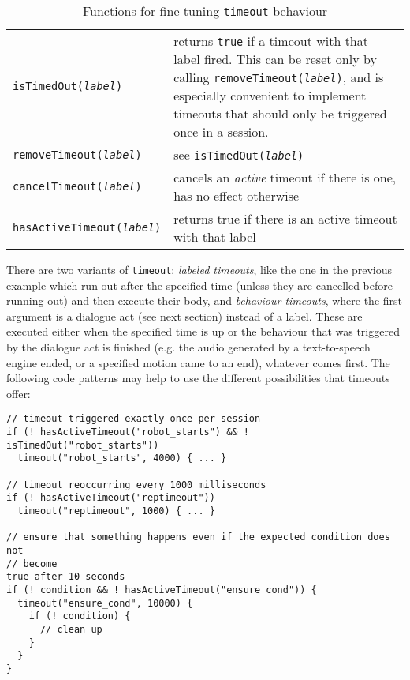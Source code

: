 \begin{table}[htb]
\begin{tabular}{lp{}}
\texttt{isTimedOut(\emph{label})}& returns \texttt{true} if a timeout with that
  label fired. This can be reset only by calling
  \texttt{removeTimeout(\emph{label})}, and is especially convenient to
  implement timeouts that should only be triggered once in a session. \\
\texttt{removeTimeout(\emph{label})}& see \texttt{isTimedOut(\emph{label})}\\
\texttt{cancelTimeout(\emph{label})}& cancels an \emph{active} timeout if there
                                      is one, has no effect otherwise \\
\texttt{hasActiveTimeout(\emph{label})}& returns true if there is an
  active timeout with that label \\
\end{tabular}
\caption{\label{tbl:timeoutfns}Functions for fine tuning \texttt{timeout} behaviour}
\end{table}

There are two variants of \texttt{timeout}: \emph{labeled timeouts}, like the
one in the previous example which run out after the specified time (unless they
are cancelled before running out) and then execute their body, and
\emph{behaviour timeouts}, where the first argument is a dialogue act (see next
section) instead of a label. These are executed either when the specified time
is up or the behaviour that was triggered by the dialogue act is finished
(e.g. the audio generated by a text-to-speech engine ended, or a specified
motion came to an end), whatever comes first.
\newpage
The following code patterns may help to use the different possibilities that
timeouts offer:

{\small%
\begin{lstlisting}
// timeout triggered exactly once per session
if (! hasActiveTimeout("robot_starts") && ! isTimedOut("robot_starts"))
  timeout("robot_starts", 4000) { ... }

// timeout reoccurring every 1000 milliseconds
if (! hasActiveTimeout("reptimeout"))
  timeout("reptimeout", 1000) { ... }

// ensure that something happens even if the expected condition does not
// become
true after 10 seconds
if (! condition && ! hasActiveTimeout("ensure_cond")) {
  timeout("ensure_cond", 10000) {
    if (! condition) {
      // clean up
    }
  }
}
\end{lstlisting}}

